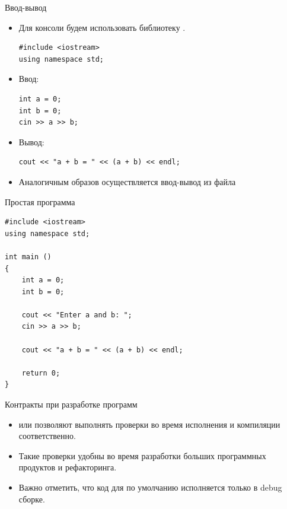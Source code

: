 \documentclass[aspectration=1610,t]{beamer}
\begin{document}
\begin{frame}[fragile]{Ввод-вывод}
    \begin{itemize}    
        \item Для консоли будем использовать библиотеку .
        \begin{lstlisting}
#include <iostream>
using namespace std;
            \end{lstlisting}
        \item Ввод:
            \begin{lstlisting}
int a = 0;
int b = 0;
cin >> a >> b;
            \end{lstlisting}
        \item Вывод:
            \begin{lstlisting}
cout << "a + b = " << (a + b) << endl;
            \end{lstlisting}
        \item Аналогичным образов осуществляется ввод-вывод из файла 
    \end{itemize}
\end{frame}

\begin{frame}[fragile]{Простая программа}
    \begin{lstlisting}
#include <iostream>
using namespace std;

int main () 
{
    int a = 0;
    int b = 0;

    cout << "Enter a and b: ";
    cin >> a >> b;

    cout << "a + b = " << (a + b) << endl;

    return 0;
}
    \end{lstlisting}
\end{frame}

\begin{frame}[fragile]{Контракты при разработке программ}
    \begin{itemize}
        \item {} или  
            позволяют выполнять проверки во время исполнения и компиляции соответственно.
        \item Такие проверки удобны во время разработки больших программных продуктов и рефакторинга.
        \item Важно отметить, что код для  
            по умолчанию исполняется только в debug сборке.
    \end{itemize}
\end{frame}
\end{document}
